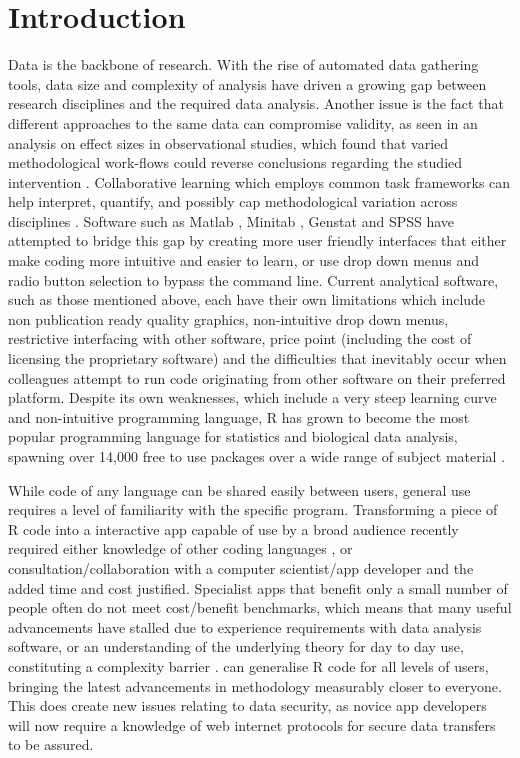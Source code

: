 \section{Introduction}
Data is the backbone of research.  With the rise of automated data gathering tools, data size and complexity of analysis have driven a growing gap between research disciplines and the required data analysis.  Another issue is the fact that different approaches to the same data can compromise validity, as seen in an analysis on effect sizes in observational studies, which found that varied methodological work-flows could reverse conclusions regarding the studied intervention \citep{donoho_50_2017}.  Collaborative learning which employs common task frameworks can help interpret, quantify, and possibly cap methodological variation across disciplines \citep{donoho_50_2017}.  Software such as Matlab \citet{moler_matlab_2012}, Minitab \citet{arend_minitab_2010}, Genstat \citet{payne_genstat_2007} and SPSS \citet{landau_handbook_2004} have attempted to bridge this gap by creating more user friendly interfaces that either make coding more intuitive and easier to learn, or use drop down menus and radio button selection to bypass the command line.  Current analytical software, such as those mentioned above, each have their own limitations which include non publication ready quality graphics, non-intuitive drop down menus, restrictive interfacing with other software, price point (including the cost of licensing the proprietary software) and the difficulties that inevitably occur when colleagues attempt to run code originating from other software on their preferred platform.  Despite its own weaknesses, which include a very steep learning curve and non-intuitive programming language, R \citep{r_core_team_r_2019} has grown to become the most popular programming language for statistics and biological data analysis, spawning over 14,000 free to use packages over a wide range of subject material \citep{li_bioinstaller_2018}.

While code of any language can be shared easily between users, general use requires a level of familiarity with the specific program.  Transforming a piece of R code into a interactive app capable of use by a broad audience recently required either knowledge of other coding languages \citep{gunuganti_application_2018}, or consultation/collaboration with a computer scientist/app developer and the added time and cost justified.  Specialist apps that benefit only a small number of people often do not meet cost/benefit benchmarks, which means that many useful advancements have stalled due to experience requirements with data analysis software, or an understanding of the underlying theory for day to day use, constituting a complexity barrier \citep{depalma_disk_2013}.   can generalise R code for all levels of users, bringing the latest advancements in methodology measurably closer to everyone. This does create new issues relating to data security, as novice app developers will now require a knowledge of web internet protocols for secure data transfers to be assured.

